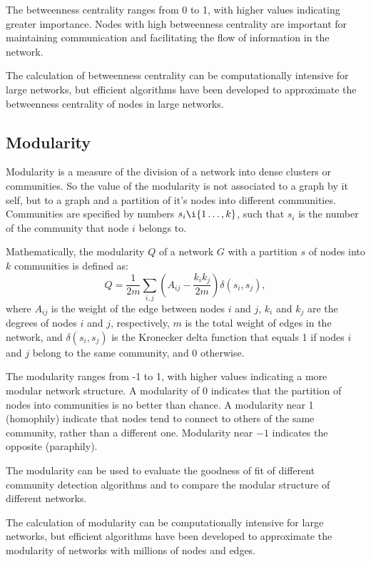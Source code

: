 The betweenness centrality ranges from 0 to 1, with higher values indicating greater importance. Nodes with high betweenness centrality are important for maintaining communication and facilitating the flow of information in the network.

The calculation of betweenness centrality can be computationally intensive for large networks, but efficient algorithms have been developed to approximate the betweenness centrality of nodes in large networks.

\subsection{Modularity}

Modularity is a measure of the division of a network into dense clusters or communities. So the value of the modularity is not associated to a graph by it self, but to a graph and a partition of it's nodes into different communities. Communities are specified by numbers $s_i \i \{1\ldots,k\}$, such that  $s_i$ is the number of the community that node $i$ belongs to.


Mathematically, the modularity $Q$ of a network $G$ with a partition $s$ of nodes into $k$ communities is defined as:
\begin{equation}
    Q = \frac{1}{2m} \sum_{i,j} \left( A_{ij} - \frac{k_i k_j}{2m} \right) \delta(s_i, s_j),
\end{equation}
where $A_{ij}$ is the weight of the edge between nodes $i$ and $j$, $k_i$ and $k_j$ are the degrees of nodes $i$ and $j$, respectively, $m$ is the total weight of edges in the network, and $\delta(s_i, s_j)$ is the Kronecker delta function that equals 1 if nodes $i$ and $j$ belong to the same community, and 0 otherwise. 

The modularity ranges from -1 to 1, with higher values indicating a more modular network structure. A modularity of 0 indicates that the partition of nodes into communities is no better than chance. A modularity near 1 (homophily) indicate that nodes tend to connect to others of the same community, rather than a different one. Modularity near $-1$ indicates the opposite (paraphily).

The modularity can be used to evaluate the goodness of fit of different community detection algorithms and to compare the modular structure of different networks.

The calculation of modularity can be computationally intensive for large networks, but efficient algorithms have been developed to approximate the modularity of networks with millions of nodes and edges.

